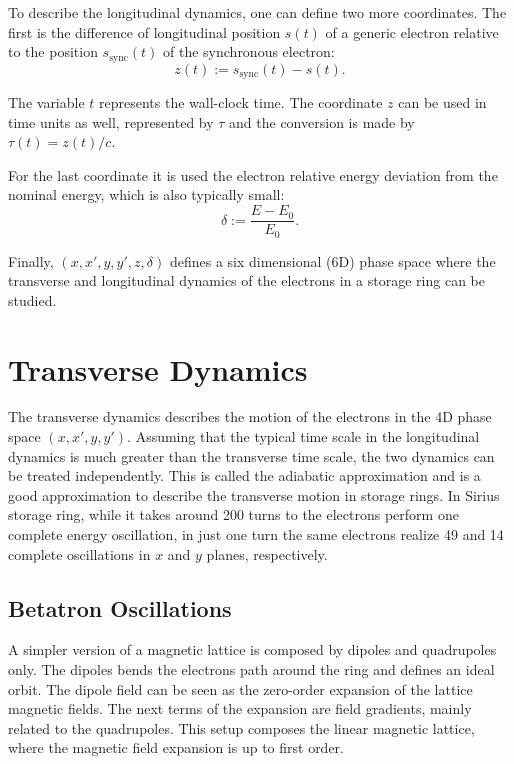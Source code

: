 To describe the longitudinal dynamics, one can define two more coordinates. The first is the difference of longitudinal position $s(t)$ of a generic electron relative to the position $s_{\mathrm{sync}}(t)$ of the synchronous electron:
\begin{equation}
    z(t) := s_{\mathrm{sync}}(t) - s(t).
\end{equation}

The variable $t$ represents the wall-clock time. The coordinate $z$ can be used in time units as well, represented by $\tau$ and the conversion is made by $\tau(t) = z(t)/c$. 

For the last coordinate it is used the electron relative energy deviation from the nominal energy, which is also typically small:
\begin{equation}
    \delta := \frac{E - E_0}{E_0}.
\end{equation}

Finally, $(x, x', y, y', z, \delta)$ defines a six dimensional (6D) phase space where the transverse and longitudinal dynamics of the electrons in a storage ring can be studied.
\section{Transverse Dynamics}\label{tranverse}
The transverse dynamics describes the motion of the electrons in the 4D phase space $(x, x', y, y')$. Assuming that the typical time scale in the longitudinal dynamics is much greater than the transverse time scale, the two dynamics can be treated independently. This is called the adiabatic approximation and is a good approximation to describe the transverse motion in storage rings. In Sirius storage ring, while it takes around 200 turns to the electrons perform one complete energy oscillation, in just one turn the same electrons realize 49 and 14 complete oscillations in $x$ and $y$ planes, respectively.

\subsection{Betatron Oscillations}
A simpler version of a magnetic lattice is composed by dipoles and quadrupoles only. The dipoles bends the electrons path around the ring and defines an ideal orbit. The dipole field can be seen as the zero-order expansion of the lattice magnetic fields. The next terms of the expansion are field gradients, mainly related to the quadrupoles. This setup composes the linear magnetic lattice, where the magnetic field expansion is up to first order.

